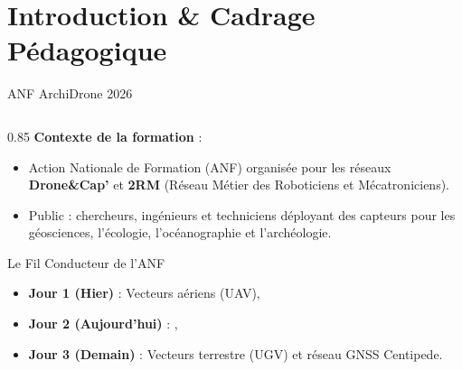 
\section{Introduction \& Cadrage Pédagogique}

\begin{frame}{ANF ArchiDrone 2026}
  \begin{columns}
    \begin{column}{0.85\textwidth}
      \textbf{Contexte de la formation} :
      \begin{itemize}
        \item Action Nationale de Formation (ANF) organisée pour les réseaux \textbf{Drone\&Cap'} et \textbf{2RM} (Réseau Métier des Roboticiens et Mécatroniciens).
        \item Public : chercheurs, ingénieurs et techniciens déployant des capteurs pour les géosciences, l'écologie, l'océanographie et l'archéologie.
      \end{itemize}

      \vspace{0.5em}
      \begin{block}{Le Fil Conducteur de l'ANF}
        \begin{itemize}
          \item \textbf{Jour 1 (Hier)} : Vecteurs aériens (UAV),
          \item \textbf{Jour 2 (Aujourd'hui)} : ,
          \item \textbf{Jour 3 (Demain)} : Vecteurs terrestre (UGV) et réseau GNSS Centipede.
        \end{itemize}
      \end{block}
    \end{column}
  \end{columns}
\end{frame}

